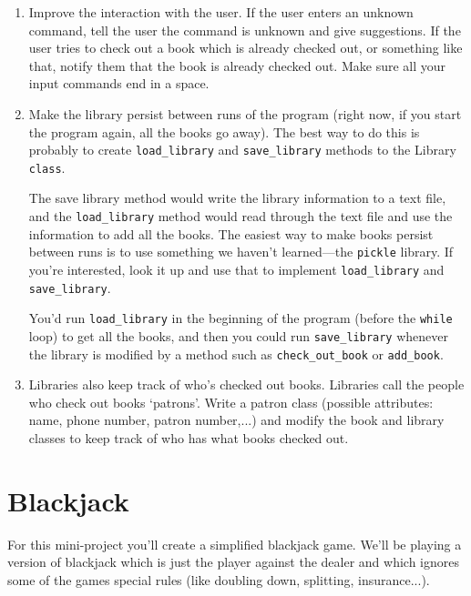 \documentclass{hitec}
\begin{document}
\begin{enumerate}
	\item Improve the interaction with the user. If the user enters an unknown command, tell the user the command is unknown and give suggestions. If the user tries to check out a book which is already checked out, or something like that, notify them that the book is already checked out. Make sure all your input commands end in a space.

	\item Make the library persist between runs of the program (right now, if you start the program again, all the books go away). The best way to do this is probably to create \texttt{load\_library} and \texttt{save\_library} methods to the Library \texttt{class}.
	
		The save library method would write the library information to a text file, and the \texttt{load\_library} method would read through the text file and use the information to add all the books. The easiest way to make books persist between runs is to use something we haven't learned---the \texttt{pickle} library. If you're interested, look it up and use that to implement \texttt{load\_library} and \texttt{save\_library}. 
		
		You'd run \texttt{load\_library} in the beginning of the program (before the \texttt{while} loop) to get all the books, and then you could run \texttt{save\_library} whenever the library is modified by a method such as \texttt{check\_out\_book} or \texttt{add\_book}.

	\item Libraries also keep track of who's checked out books. Libraries call the people who check out books `patrons'. Write a patron class (possible attributes: name, phone number, patron number,...) and modify the book and library classes to keep track of who has what books checked out.
\end{enumerate}

\section{Blackjack}

For this mini-project you'll create a simplified blackjack game. We'll be playing a version of blackjack which is just the player against the dealer and which ignores some of the games special rules (like doubling down, splitting, insurance...).
\end{document}
